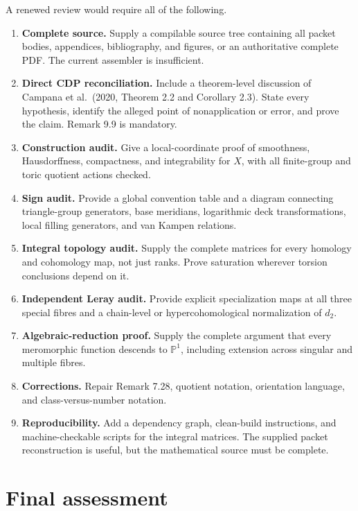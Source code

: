 \documentclass[
  10pt,
]{article}
\providecommand{\tightlist}{%
  \setlength{\itemsep}{0pt}\setlength{\parskip}{0pt}}
\begin{document}
A renewed review would require all of the following.

\begin{enumerate}
\def\labelenumi{\arabic{enumi}.}
\tightlist
\item
  \textbf{Complete source.} Supply a compilable source tree containing
  all packet bodies, appendices, bibliography, and figures, or an
  authoritative complete PDF. The current assembler is insufficient.
\item
  \textbf{Direct CDP reconciliation.} Include a theorem-level discussion
  of Campana et al.~(2020, Theorem 2.2 and Corollary 2.3). State every
  hypothesis, identify the alleged point of nonapplication or error, and
  prove the claim. Remark 9.9 is mandatory.
\item
  \textbf{Construction audit.} Give a local-coordinate proof of
  smoothness, Hausdorffness, compactness, and integrability for \(X\),
  with all finite-group and toric quotient actions checked.
\item
  \textbf{Sign audit.} Provide a global convention table and a diagram
  connecting triangle-group generators, base meridians, logarithmic deck
  transformations, local filling generators, and van Kampen relations.
\item
  \textbf{Integral topology audit.} Supply the complete matrices for
  every homology and cohomology map, not just ranks. Prove saturation
  wherever torsion conclusions depend on it.
\item
  \textbf{Independent Leray audit.} Provide explicit specialization maps
  at all three special fibres and a chain-level or hypercohomological
  normalization of \(d_2\).
\item
  \textbf{Algebraic-reduction proof.} Supply the complete argument that
  every meromorphic function descends to \(\mathbb P^1\), including
  extension across singular and multiple fibres.
\item
  \textbf{Corrections.} Repair Remark 7.28, quotient notation,
  orientation language, and class-versus-number notation.
\item
  \textbf{Reproducibility.} Add a dependency graph, clean-build
  instructions, and machine-checkable scripts for the integral matrices.
  The supplied packet reconstruction is useful, but the mathematical
  source must be complete.
\end{enumerate}

\section{Final assessment}\label{final-assessment}
\end{document}
